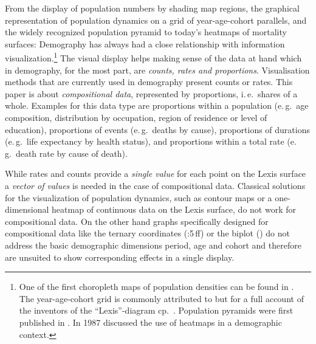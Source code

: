 \documentclass{scrartcl}
\begin{document}
\noindent From the display of population numbers by shading map regions, the graphical representation of population dynamics on a grid of year-age-cohort parallels, and the widely recognized population pyramid to today's heatmaps of mortality surfaces: Demography has always had a close relationship with information visualization.\footnote{One of the first choropleth maps of population densities can be found in \textcite{Dangeville1836}. The year-age-cohort grid is commonly attributed to \textcite{Lexis1875} but for a full account of the inventors of the \enquote{Lexis}-diagram cp.~\textcite{Vandeschrick2001}. Population pyramids were first published in \textcite{Walker1874}. In 1987 \textcite{Vaupel1987} discussed the use of heatmaps in a demographic context.} The visual display helps making sense of the data at hand which in demography, for the most part, are \emph{counts, rates and proportions}. Visualisation methods that are currently used in demography present counts or rates. This paper is about \emph{compositional data}, represented by proportions, i.\,e.~shares of a whole. Examples for this data type are proportions within a population (e.\,g.~age composition, distribution by occupation, region of residence or level of education), proportions of events (e.\,g.~deaths by cause), proportions of durations (e.\,g.~life expectancy by health status), and proportions within a total rate (e.\,g.~death rate by cause of death).

While rates and counts provide a \emph{single value} for each point on the Lexis surface a \emph{vector of values} is needed in the case of compositional data. Classical solutions for the visualization of population dynamics, such as contour maps or a one-dimensional heatmap of continuous data on the Lexis surface, do not work for compositional data. On the other hand graphs specifically designed for compositional data like the ternary coordinates (\cite{Aitchison1986}:5\,ff) or the biplot (\cite{Gabriel1971, Aitchison2002}) do not address the basic demographic dimensions period, age and cohort and therefore are unsuited to show corresponding effects in a single display.
\end{document}
